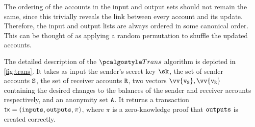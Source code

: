 The ordering of the accounts in the input and output sets should not remain the same, since this trivially reveals the link between every account and its update.
Therefore, the input and output lists are always ordered in some canonical order. This can be thought of as applying a random permutation to shuffle the updated accounts.


The detailed description of the $\trans$ algorithm is depicted in \autoref{fig:trans}. It takes as input the sender's secret key $\sk$, the set of sender accounts $\mathtt{S}$, the set of receiver accounts $\mathtt{R}$, two vectors $\vv{\v_\sset}, \vv{\v_\rset}$ containing the desired changes to the balances of the sender and receiver accounts respectively, and an anonymity set ${\mathtt{A}}$. It returns a transaction $\textup{\textsf{tx}} = ({\textup{\texttt{inputs}}}, {\textup{\texttt{outputs}}}, \pi)$, where $\pi$ is a zero-knowledge proof that ${\textup{\texttt{outputs}}}$ is created correctly.

